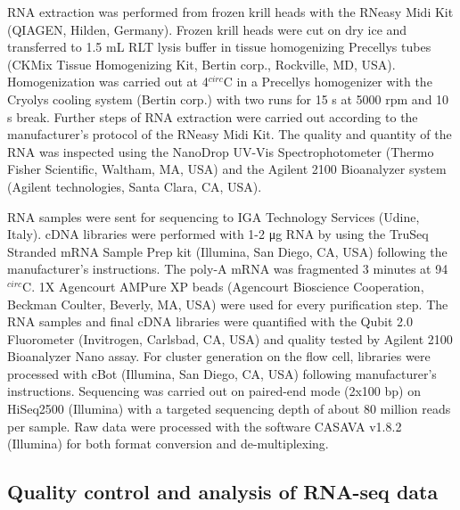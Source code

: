 RNA extraction was performed from frozen krill heads with the RNeasy Midi Kit
(QIAGEN, Hilden, Germany). Frozen krill heads were cut on dry ice and
transferred to 1.5 mL RLT lysis buffer in tissue homogenizing
Precellys\textsuperscript{\textregistered} tubes (CKMix Tissue Homogenizing
Kit, Bertin corp., Rockville, MD, USA).  Homogenization was carried out at
4$^{circ}$C in a Precellys\textsuperscript{\textregistered} homogenizer with
the Cryolys\textsuperscript{\textregistered} cooling system (Bertin corp.) with
two runs for 15 s at 5000 rpm and 10 s break. Further steps of RNA extraction
were carried out according to the manufacturer's protocol of the RNeasy Midi
Kit. The quality and quantity of the RNA was inspected using the
NanoDrop UV-Vis Spectrophotometer (Thermo Fisher Scientific,
Waltham, MA, USA) and the Agilent 2100 Bioanalyzer system (Agilent
technologies, Santa Clara, CA, USA).

RNA samples were sent for sequencing to IGA Technology Services (Udine, Italy).
cDNA libraries were performed with 1-2 μg RNA by using the TruSeq Stranded mRNA
Sample Prep kit (Illumina, San Diego, CA, USA) following the manufacturer's
instructions. The poly-A mRNA was fragmented 3 minutes at 94$^{circ}$C. 1X
Agencourt AMPure XP beads (Agencourt Bioscience Cooperation, Beckman Coulter,
Beverly, MA, USA) were used for every purification step. The RNA samples and
final cDNA libraries were quantified with the Qubit 2.0 Fluorometer
(Invitrogen, Carlsbad, CA, USA) and quality tested by Agilent 2100 Bioanalyzer
Nano assay.  For cluster generation on the flow cell, libraries were processed
with cBot (Illumina, San Diego, CA, USA) following manufacturer's instructions.
Sequencing was carried out on paired-end mode (2x100 bp) on HiSeq2500
(Illumina) with a targeted sequencing depth of about 80 million reads per
sample. Raw data were processed with the software CASAVA v1.8.2 (Illumina) for
both format conversion and de-multiplexing.

\subsection*{Quality control and analysis of RNA-seq data}

